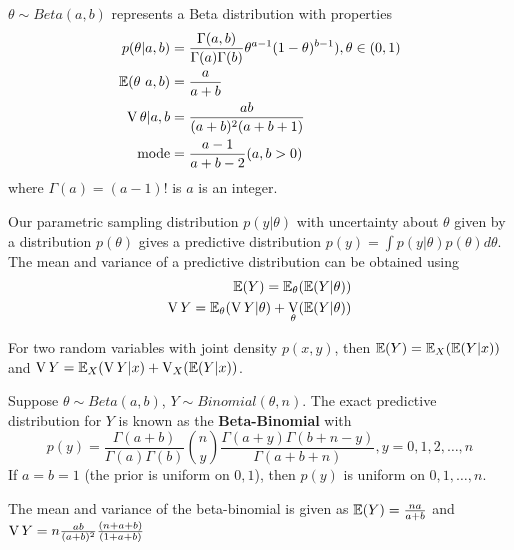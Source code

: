\begin{defn}
  \label{sec:prob-bayes-theor-4}
  $\theta \sim Beta(a, b)$ represents a Beta distribution with
  properties
  \begin{align}
    p(\theta | a, b) &= \frac{\Gamma(a, b)}{\Gamma(a) \Gamma(b)} \theta^{a-1} (1 - \theta)^{b-1}), \theta \in (0, 1) \\
    \E{\theta \ a, b} &= \frac{a}{a+b} \\
    \V{\theta | a, b} &= \frac{ab}{(a+b)^{2}(a+b+1)} \\
    \text{mode} &= \frac{a-1}{a+b - 2}  (a, b > 0) \\
  \end{align}
  where $\Gamma(a) = (a-1)!$ is $a$ is an integer.
\end{defn}

\begin{thm}
  \label{sec:prob-bayes-theor-5}
  Our parametric sampling distribution $p(y | \theta)$ with
  uncertainty about $\theta$ given by a distribution $p(\theta)$ gives
  a predictive distribution $p(y) = \int p(y| \theta) p(\theta)
  d\theta$. 
  The mean and variance of a predictive distribution can be obtained
  using
  \begin{align}
    \label{eq:4}
    \E{Y} = \E_{\theta}(\E{Y | \theta}) \\
    \V{Y} = \E_{\theta}(\V{Y | \theta}) + \V_{\theta}(\E{Y | \theta})
  \end{align}
\end{thm}

\begin{thm}
  \label{sec:prob-bayes-theor-6}
  For two random variables with joint density $p(x, y)$, then $\E{Y} =
  \E_{X}(\E{Y | x})$ and $\V{Y} = \E_{X}(\V{Y | x}) + \V_{X}(\E{Y|x})$.
\end{thm}

\begin{defn}
  \label{sec:prob-bayes-theor-7}
  Suppose $\theta \sim Beta(a, b)$, $Y \sim Binomial(\theta, n)$.  The
  exact predictive distribution for $Y$ is known as the
  \textbf{Beta-Binomial} with
  \begin{equation}
    \label{eq:5}
    p(y) = \frac{\Gamma(a+b)}{\Gamma(a) \Gamma(b)}  {n \choose y}
    \frac{\Gamma(a+y) \Gamma(b + n - y)}{\Gamma(a + b + n)}, y = 0,1,2,\dots,n
  \end{equation}
  If $a = b = 1$ (the prior is uniform on $0, 1$), then $p(y)$ is
  uniform on $0, 1, \dots, n$.

  The mean and variance of the beta-binomial is given as $\E{Y} =
  \frac{na}{a+b}$ and $\operatorname*{V}{Y} = n \frac{ab}{(a+b)^{2}} \frac{(n+a+b)}{(1+a+b)}$
\end{defn}

